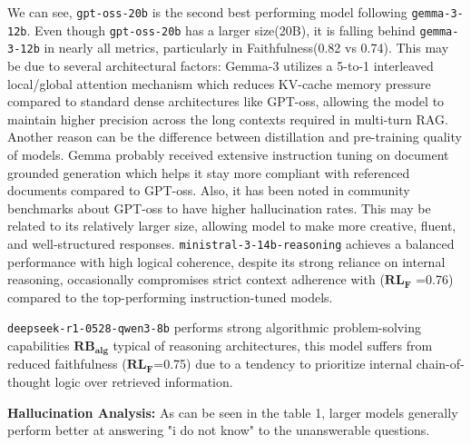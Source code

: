\documentclass[11pt]{article}
\begin{document}
We can see, \texttt{gpt-oss-20b} is the second best performing model following \texttt{gemma-3-12b}. Even though \texttt{gpt-oss-20b} has a larger size(20B), it is falling behind \texttt{gemma-3-12b} in nearly all metrics, particularly in Faithfulness(0.82 vs 0.74). This may be due to several architectural factors: Gemma-3 utilizes a 5-to-1 interleaved local/global attention mechanism which reduces KV-cache memory pressure compared to standard dense architectures like GPT-oss, allowing the model to maintain higher precision across the long contexts required in multi-turn RAG. Another reason can be the difference between distillation and pre-training quality of models. Gemma probably received extensive instruction tuning on document grounded generation which helps it stay more compliant with referenced documents compared to GPT-oss.  Also, it has been noted in community benchmarks about GPT-oss to have higher hallucination rates. This may be related to its relatively larger size, allowing model to make more creative, fluent, and well-structured responses.
\texttt{ministral-3-14b-reasoning} achieves a balanced performance with high logical coherence, despite its strong reliance on internal reasoning, occasionally compromises strict context adherence with ($\mathbf{RL_{F}}$ =0.76) compared to the top-performing instruction-tuned models.

\texttt{deepseek-r1-0528-qwen3-8b} performs strong algorithmic problem-solving capabilities $\mathbf{RB_{alg}}$ typical of reasoning architectures, this model suffers from reduced faithfulness ($\mathbf{RL_{F}}$=0.75) due to a tendency to prioritize internal chain-of-thought logic over retrieved information.

\textbf{Hallucination Analysis:} As can be seen in the table 1, larger models generally perform better at answering "i do not know" to the unanswerable questions.
\end{document}
